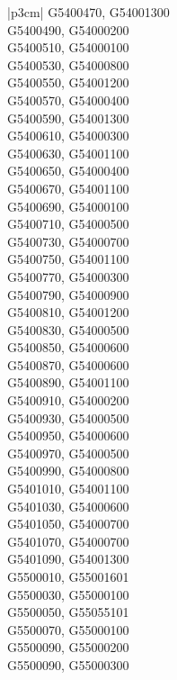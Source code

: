 \begin{customLongTable}{ |p{3cm}| }
G5400470, G54001300 \\ \hline
G5400490, G54000200 \\ \hline
G5400510, G54000100 \\ \hline
G5400530, G54000800 \\ \hline
G5400550, G54001200 \\ \hline
G5400570, G54000400 \\ \hline
G5400590, G54001300 \\ \hline
G5400610, G54000300 \\ \hline
G5400630, G54001100 \\ \hline
G5400650, G54000400 \\ \hline
G5400670, G54001100 \\ \hline
G5400690, G54000100 \\ \hline
G5400710, G54000500 \\ \hline
G5400730, G54000700 \\ \hline
G5400750, G54001100 \\ \hline
G5400770, G54000300 \\ \hline
G5400790, G54000900 \\ \hline
G5400810, G54001200 \\ \hline
G5400830, G54000500 \\ \hline
G5400850, G54000600 \\ \hline
G5400870, G54000600 \\ \hline
G5400890, G54001100 \\ \hline
G5400910, G54000200 \\ \hline
G5400930, G54000500 \\ \hline
G5400950, G54000600 \\ \hline
G5400970, G54000500 \\ \hline
G5400990, G54000800 \\ \hline
G5401010, G54001100 \\ \hline
G5401030, G54000600 \\ \hline
G5401050, G54000700 \\ \hline
G5401070, G54000700 \\ \hline
G5401090, G54001300 \\ \hline
G5500010, G55001601 \\ \hline
G5500030, G55000100 \\ \hline
G5500050, G55055101 \\ \hline
G5500070, G55000100 \\ \hline
G5500090, G55000200 \\ \hline
G5500090, G55000300 \\ \hline

\end{customLongTable}

